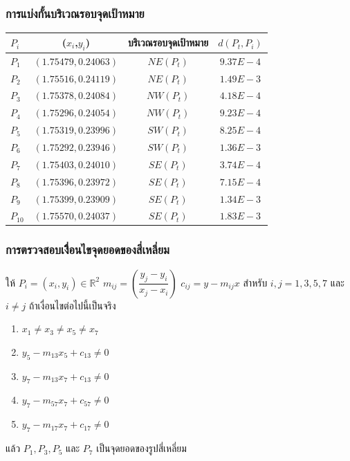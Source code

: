 \documentclass[12pt,aspectratio=169]{beamer}
\begin{document}
\begin{frame}
    \frametitle{การแบ่งกั้นบริเวณรอบจุดเป้าหมาย}
    \begin{example}
        \begin{center}
            \begin{tabular}{lccc} 
            \hline
           $P_i$ & ($x_i$,$y_i$) &  บริเวณรอบจุดเป้าหมาย & $d(P_t,P_i)$\\
            \hline
            \cellcolor{red}$P_1$ &\cellcolor{red}$(1.75479,0.24063)$ &\cellcolor{red}$NE(P_t)$  &\cellcolor{red}$9.37E-4$\\
            $P_2$ &$(1.75516,0.24119)$ &$NE(P_t)$&$1.49E-3$\\
            \hline
            \cellcolor{red}$P_3$ &\cellcolor{red}$(1.75378,0.24084)$ &\cellcolor{red}$NW(P_t)$ &\cellcolor{red}$4.18E-4$\\
            $P_4$ &$(1.75296,0.24054)$ &$NW(P_t)$&$9.23E-4$\\
            \hline
            \cellcolor{red}$P_5$ &\cellcolor{red}$(1.75319,0.23996)$ &\cellcolor{red}$SW(P_t)$&\cellcolor{red}$8.25E-4$\\
            $P_6$ &$(1.75292,0.23946)$ &$SW(P_t)$&$1.36E-3$\\
            \hline
            \cellcolor{red}$P_7$ &\cellcolor{red}$(1.75403,0.24010)$ &\cellcolor{red}$SE(P_t)$&\cellcolor{red}$3.74E-4$\\
            $P_8$ &$(1.75396,0.23972)$ &$SE(P_t)$&$7.15E-4$\\
            $P_9$ &$(1.75399,0.23909)$ &$SE(P_t)$&$1.34E-3$\\
            $P_{10}$ &$(1.75570,0.24037)$ &$SE(P_t)$&$1.83E-3$\\
            \hline
            \end{tabular}
        \end{center}
\end{example}
\end{frame}

\begin{frame}
\frametitle{การตรวจสอบเงื่ิอนไขจุดยอดของสี่เหลี่ยม}

	ให้ $P_i=(x_i,y_i) \in \mathbb{R}^2$   $m_{ij} =\left(\dfrac{y_j-y_i}{x_j-x_i} \right)$  $c_{ij} = y-m_{ij}x $ สำหรับ $i,j = 1,3,5,7$ และ $i \neq  j$ 
ถ้าเงื่อนไขต่อไปนี้เป็นจริง 
\begin{enumerate}
\item \label{condition1} $x_{1}  \neq x_{3} \neq x_{5} \neq x_{7}$
\item \label{condition2} $y_5 - m_{13}x_5 + c_{13} \neq 0$
\item \label{condition3} $y_7 - m_{13}x_7 + c_{13} \neq 0$
\item \label{condition4} $y_7 - m_{57}x_7 + c_{57} \neq 0$
\item \label{condition5} $y_7 - m_{17}x_7 + c_{17} \neq 0$
\end{enumerate}
แล้ว $P_1,P_3,P_5$ และ $P_7$ เป็นจุดยอดของรูปสี่เหลี่ยม
\end{frame}
\end{document}
